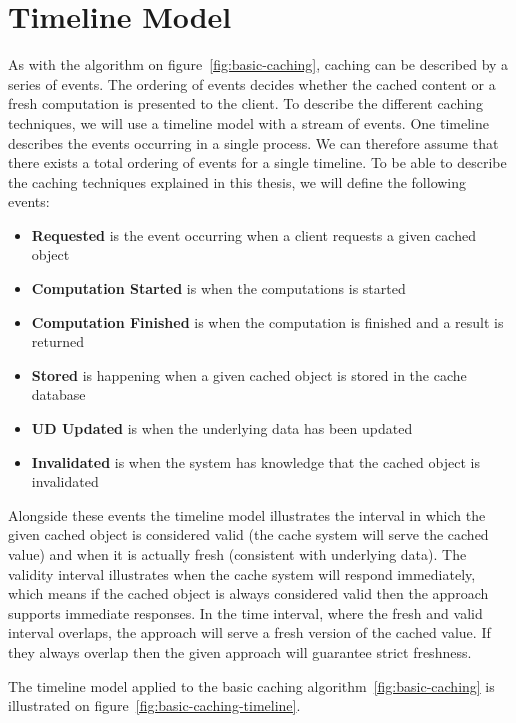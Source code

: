 
\section{Timeline Model}
\label{sec:timeline-model}

As with the algorithm on figure~\ref{fig:basic-caching}, caching can be described by a series of events. The ordering of events decides whether the cached content or a fresh computation is presented to the client. To describe the different caching techniques, we will use a timeline model with a stream of events. One timeline describes the events occurring in a single process. We can therefore assume that there exists a total ordering of events for a single timeline. To be able to describe the caching techniques explained in this thesis, we will define the following events:

\begin{itemize}
  \item \textbf{Requested} is the event occurring when a client requests a given cached object
  \item \textbf{Computation Started} is when the computations is started
  \item \textbf{Computation Finished} is when the computation is finished and a result is returned
  \item \textbf{Stored} is happening when a given cached object is stored in the cache database
  \item \textbf{UD Updated} is when the underlying data has been updated
  \item \textbf{Invalidated} is when the system has knowledge that the cached object is invalidated
\end{itemize}

Alongside these events the timeline model illustrates the interval in which the given cached object is considered valid (the cache system will serve the cached value) and when it is actually fresh (consistent with underlying data). The validity interval illustrates when the cache system will respond immediately, which means if the cached object is always considered valid then the approach supports immediate responses. In the time interval, where the fresh and valid interval overlaps, the approach will serve a fresh version of the cached value. If they always overlap then the given approach will guarantee strict freshness.

The timeline model applied to the basic caching algorithm~\ref{fig:basic-caching} is illustrated on figure~\ref{fig:basic-caching-timeline}.

